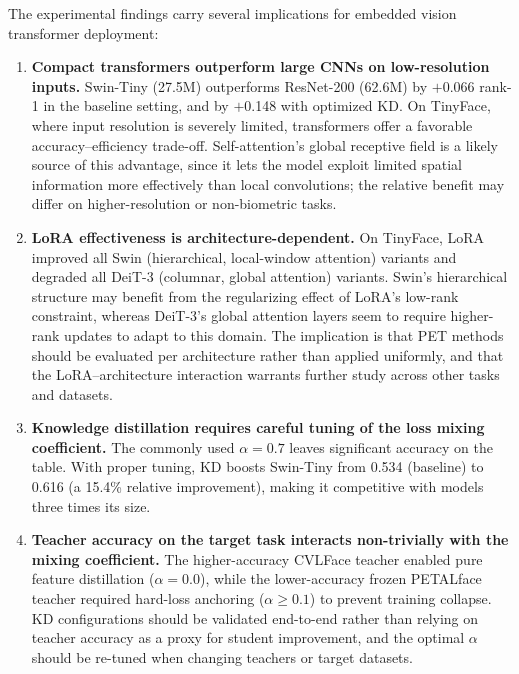 \documentclass[runningheads,a4paper]{llncs}
\begin{document}
The experimental findings carry several implications for embedded vision transformer deployment:

\begin{enumerate}
    \item \textbf{Compact transformers outperform large CNNs on low-resolution inputs.} Swin-Tiny (27.5M) outperforms ResNet-200 (62.6M) by $+$0.066 rank-1 in the baseline setting, and by $+$0.148 with optimized KD. On TinyFace, where input resolution is severely limited, transformers offer a favorable accuracy--efficiency trade-off. Self-attention's global receptive field is a likely source of this advantage, since it lets the model exploit limited spatial information more effectively than local convolutions; the relative benefit may differ on higher-resolution or non-biometric tasks.

    \item \textbf{LoRA effectiveness is architecture-dependent.} On TinyFace, LoRA improved all Swin (hierarchical, local-window attention) variants and degraded all DeiT-3 (columnar, global attention) variants. Swin's hierarchical structure may benefit from the regularizing effect of LoRA's low-rank constraint, whereas DeiT-3's global attention layers seem to require higher-rank updates to adapt to this domain. The implication is that PET methods should be evaluated per architecture rather than applied uniformly, and that the LoRA--architecture interaction warrants further study across other tasks and datasets.

    \item \textbf{Knowledge distillation requires careful tuning of the loss mixing coefficient.} The commonly used $\alpha = 0.7$ leaves significant accuracy on the table. With proper tuning, KD boosts Swin-Tiny from 0.534 (baseline) to 0.616 (a 15.4\% relative improvement), making it competitive with models three times its size.

    \item \textbf{Teacher accuracy on the target task interacts non-trivially with the mixing coefficient.} The higher-accuracy CVLFace teacher enabled pure feature distillation ($\alpha = 0.0$), while the lower-accuracy frozen PETALface teacher required hard-loss anchoring ($\alpha \geq 0.1$) to prevent training collapse. KD configurations should be validated end-to-end rather than relying on teacher accuracy as a proxy for student improvement, and the optimal $\alpha$ should be re-tuned when changing teachers or target datasets.


\end{enumerate}
\end{document}
